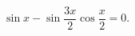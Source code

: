 \begin{ex}[type=equation]
	\begin{condition}
		$\ \sin x -\sin {\dfrac{3x}{2}}\cos{\dfrac{x}{2}} = 0. $
	\end{condition}
\end{ex}